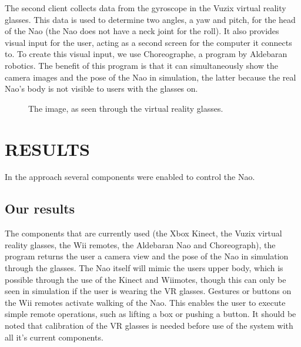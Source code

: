 \documentclass[letterpaper, 10pt, conference]{ieeeconf}
\begin{document}
The second client collects data from the gyroscope in the Vuzix virtual reality glasses. This data is used to determine two angles, a yaw and pitch, for the head of the Nao (the Nao does not have a neck joint for the roll). It also provides visual input for the user, acting as a second screen for the computer it connects to.
To create this visual input, we use Choreographe, a program by Aldebaran robotics. The benefit of this program is that it can simultaneously show the camera images and the pose of the Nao in simulation, the latter because the real Nao’s body is not visible to users with the glasses on.

\begin{figure}[ht]
\label{Choreographe}
\caption{The image, as seen through the virtual reality glasses.}
\end{figure}



\section{RESULTS}
In the approach several components were enabled to control the Nao.
\subsection{Our results}
The components that are currently used (the Xbox Kinect, the Vuzix virtual reality glasses, the Wii remotes, the Aldebaran Nao and Choreograph), the program returns the user a camera view and the pose of the Nao in simulation through the glasses. The Nao itself will mimic the users upper body, which is possible through the use of the Kinect and Wiimotes, though this can only be seen in simulation if the user is wearing the VR glasses. Gestures or buttons on the Wii remotes activate walking of the Nao. This enables the user to execute simple remote operations, such as lifting a box or pushing a button. It should be noted that calibration of the VR glasses is needed before use of the system with all it’s current components.
\end{document}

